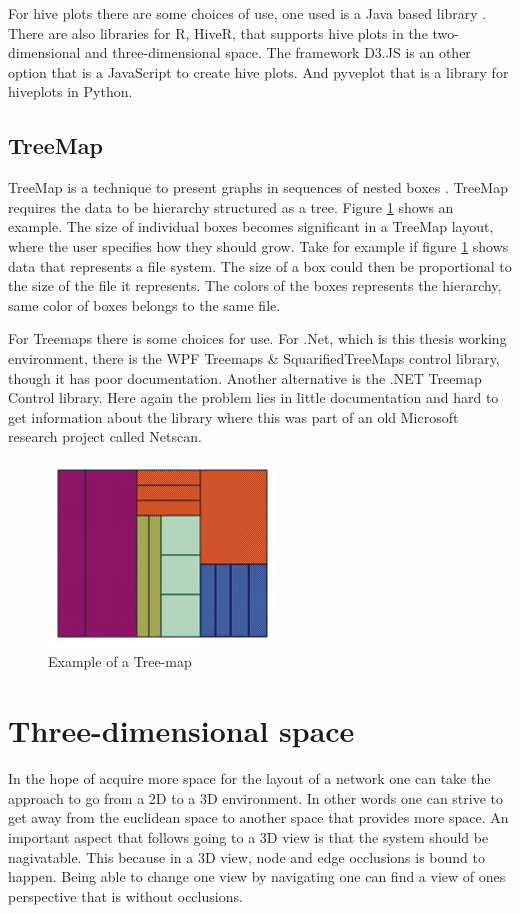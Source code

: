 \documentclass[a4paper,11pt]{kth-mag}
\begin{document}
For hive plots there are some choices of use, one used is a Java based library \cite{website:JHive}. There are also libraries for R\cite{website:R}, HiveR\cite{website:HiveR}, that supports hive plots in the two-dimensional and three-dimensional space.
The framework D3.JS\cite{website:D3JS} is an other option that is a JavaScript to create hive plots. And pyveplot\cite{website:pyveplot} that is a library for hiveplots in Python\cite{website:python}.
\subsection{TreeMap}
TreeMap is a technique to present graphs in sequences of nested boxes \cite{herman00}. TreeMap requires the data to be hierarchy structured as a tree. Figure \ref{fig:tree_map_ex} shows an example. The size of individual boxes becomes significant in 
a TreeMap layout, where the user specifies how they should grow. Take for example if figure \ref{fig:tree_map_ex} shows data that represents a file system. The size of a box could then be proportional to the size of the file it represents. The colors of the boxes 
represents the hierarchy, same color of boxes belongs to the same file.

For Treemaps there is some choices for use. For .Net, which is this thesis working environment, there is the WPF Treemaps \& SquarifiedTreeMaps control library\cite{website:WPFTreeMaps}, though it has poor documentation.
 Another alternative is the .NET Treemap Control library\cite{website:devxTreeMap}. Here again the problem lies in little documentation and hard to get information about the library where this was part of an old Microsoft
 research project called Netscan.
\begin{figure}[!htbp]
	\centering
	\includegraphics{TreeMapEx}
	\caption{Example of a Tree-map}
	\label{fig:tree_map_ex}
\end{figure}
\section{Three-dimensional space}
In the hope of acquire more space for the layout of a network one can take the approach to go from a 2D to a 3D environment. In other words one can strive to get away from the euclidean space to another space that provides more space.
 An important aspect that follows going to a 3D view is that the system should be nagivatable. This because in a 3D view, node and edge occlusions is bound to happen. Being able to change one view by navigating one can find a 
 view of ones perspective that is without occlusions.
\end{document}
